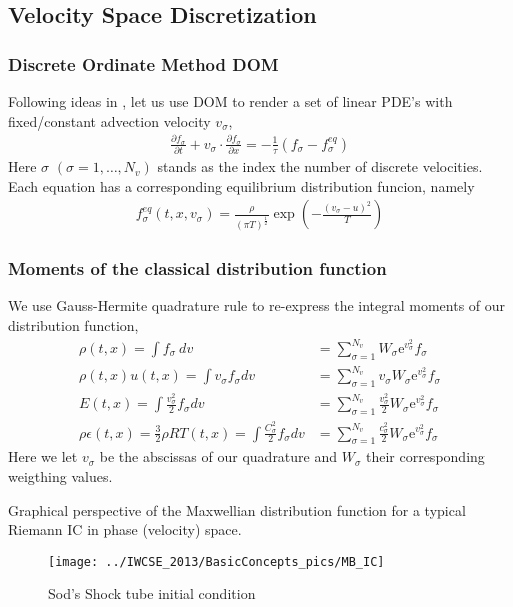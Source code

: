 \subsection{Velocity Space Discretization}
\begin{frame} \frametitle{Discrete Ordinate Method DOM}
	Following ideas in \cite{Yang1995323}, let us use DOM to render a set of linear PDE's with fixed/constant advection velocity $v_\sigma$,
	\begin{align}
		\frac{\partial{f_\sigma}}{\partial{t}} +
		v_\sigma\cdot\frac{\partial{f_\sigma}}{\partial x} = 
		-\frac{1}{\tau}(f_\sigma-f^{eq}_\sigma)
	\end{align}
Here $\sigma$ $(\sigma = 1,\dots,N_v)$ stands as the index the number of discrete velocities. Each equation has a corresponding equilibrium distribution funcion, namely
	\begin{align}
		f_\sigma^{eq}(t,x,v_\sigma)= \frac{\rho}{(\pi T)^{\frac{1}{2}}} \exp\left({-\frac{(v_\sigma-u)^2}{T}} \right)
	\end{align}
\end{frame}

\begin{frame}
	\frametitle{Moments of the classical distribution function}
	We use Gauss-Hermite quadrature rule to re-express the integral moments of our distribution function,
	\begin{subequations}
	\begin{align}
	\rho(t,x) = \int f_\sigma \ dv &= \sum_{\sigma=1}^{N_v} W_\sigma \mathrm{e}^{v_\sigma^2} f_\sigma\\
	\rho(t,x) u(t,x) = \int v_\sigma f_\sigma dv &= \sum_{\sigma=1}^{N_v} v_\sigma W_\sigma \mathrm{e}^{v_\sigma^2} f_\sigma\\
	E(t,x) = \int \frac{v_\sigma^2}{2} f_\sigma dv &= \sum_{\sigma=1}^{N_v} \frac{v_\sigma^2}{2} W_\sigma \mathrm{e}^{v_\sigma^2} f_\sigma\\
	\rho \epsilon(t,x) = \frac{3}{2}\rho RT(t,x) = \int \frac{C_\sigma^2}{2} f_\sigma dv &= \sum_{\sigma=1}^{N_v} \frac{c_\sigma^2}{2} W_\sigma \mathrm{e}^{v_\sigma^2} f_\sigma
	\end{align}
	\end{subequations}
	Here we let $v_\sigma$ be the abscissas of our quadrature and $W_\sigma$ their corresponding weigthing values. 
\end{frame} 

\begin{frame}
Graphical perspective of the Maxwellian distribution function for a typical Riemann IC in phase (velocity) space.
\begin{figure}
	\centering
	\texttt{[image: ../IWCSE\_2013/BasicConcepts\_pics/MB\_IC]}
	\caption{Sod's Shock tube initial condition}
	\label{fig:f_IC}
\end{figure}
\end{frame}

